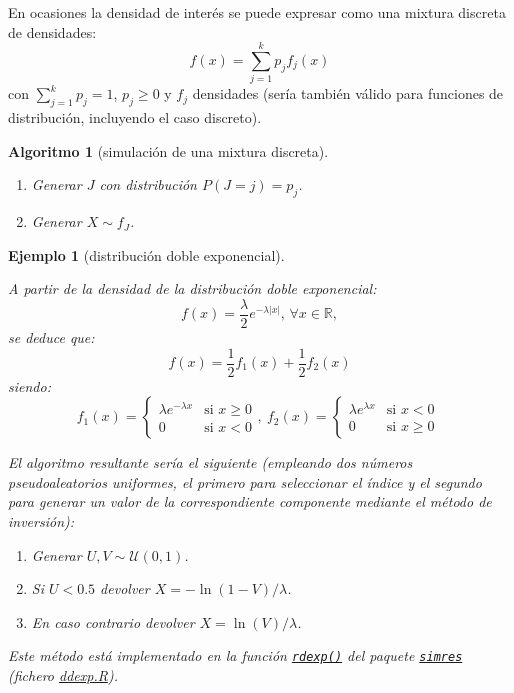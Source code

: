 \documentclass[
]{book}
\theoremstyle{break}
\newtheorem{conjecture}{Algoritmo}[chapter]
\newtheorem{example}{Ejemplo}[chapter]
\theoremstyle{nonumberplain}
\begin{document}
En ocasiones la densidad de interés se puede expresar como una mixtura discreta de densidades:
\[f(x)=\sum_{j=1}^{k}p_{j}f_{j}(x)\]
con \(\sum_{j=1}^{k}p_j=1\), \(p_j\geq 0\) y \(f_j\) densidades (sería también válido para funciones de distribución, incluyendo el caso discreto).

\begin{conjecture}[simulación de una mixtura discreta]
\protect\hypertarget{cnj:mixtura-discreta}{}\label{cnj:mixtura-discreta}

\begin{enumerate}
\def\labelenumi{\arabic{enumi}.}
\item
  Generar \(J\) con distribución \(P\left( J=j \right) = p_j\).
\item
  Generar \(X\sim f_J\).
\end{enumerate}

\end{conjecture}

\begin{example}[distribución doble exponencial]
\protect\hypertarget{exm:dexp-mix}{}\label{exm:dexp-mix}

A partir de la densidad de la distribución doble exponencial:
\[f(x) =\frac{\lambda }{2}e^{-\lambda \left\vert x\right\vert } \text{, }\forall x\in \mathbb{R},\]
se deduce que:
\[f(x) = \frac{1}{2}f_{1}(x) + \frac{1}{2}f_{2}(x)\]
siendo:
\[f_{1}(x) = \left\{ 
\begin{array}{ll}
\lambda e^{-\lambda x} & \text{si } x\geq 0 \\ 
0 & \text{si } x<0
\end{array}
\right., \  
f_{2}(x) = \left\{ 
\begin{array}{ll}
\lambda e^{\lambda x} & \text{si } x<0 \\ 
0 & \text{si } x\geq 0
\end{array}
\ \right.\]

El algoritmo resultante sería el siguiente (empleando dos números pseudoaleatorios uniformes, el primero para seleccionar el índice y el segundo para generar un valor de la correspondiente componente mediante el método de inversión):

\begin{enumerate}
\def\labelenumi{\arabic{enumi}.}
\item
  Generar \(U,V \sim \mathcal{U}(0, 1)\).
\item
  Si \(U<0.5\) devolver \(X= -\ln( 1-V )/\lambda\).
\item
  En caso contrario devolver \(X= \ln(V)/\lambda\).
\end{enumerate}

Este método está implementado en la función \href{https://rubenfcasal.github.io/simres/reference/ddexp.html}{\texttt{rdexp()}} del paquete \href{https://rubenfcasal.github.io/simres}{\texttt{simres}} (fichero \href{R/ddexp.R}{\emph{ddexp.R}}).
\end{example}
\end{document}
